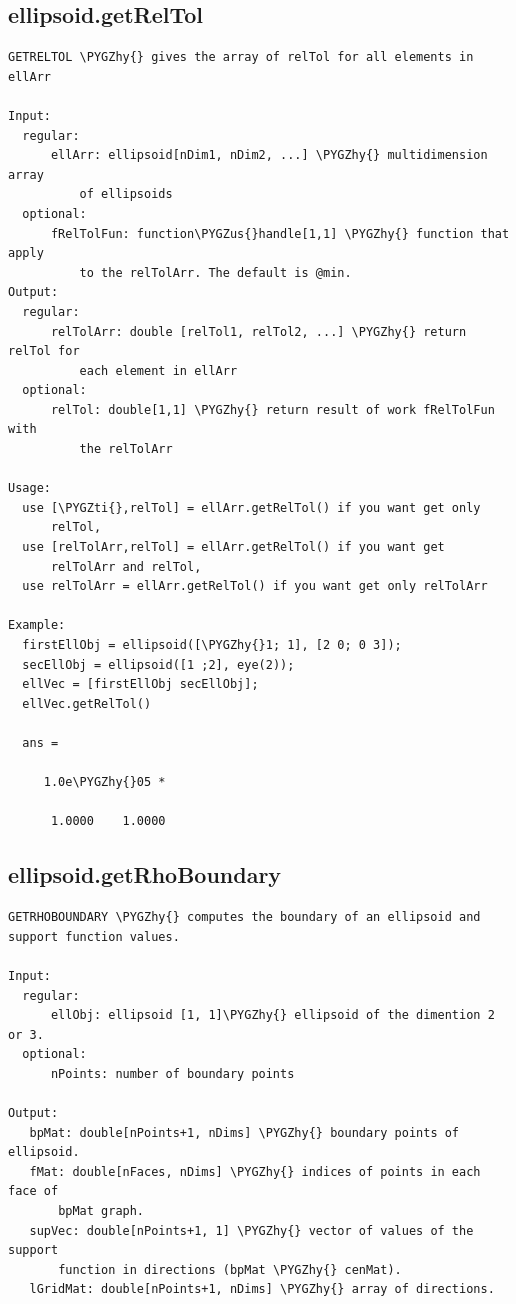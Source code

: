 \documentclass[letterpaper,10pt,english]{sphinxmanual}
\def\PYGZus{\char`\_}
\def\PYGZhy{\char`\-}
\def\PYGZti{\char`\~}
\begin{document}
\subsection{ellipsoid.getRelTol}
\label{chap_functions:ellipsoid-getreltol}
\begin{Verbatim}[commandchars=\\\{\}]
GETRELTOL \PYGZhy{} gives the array of relTol for all elements in ellArr

Input:
  regular:
      ellArr: ellipsoid[nDim1, nDim2, ...] \PYGZhy{} multidimension array
          of ellipsoids
  optional:
      fRelTolFun: function\PYGZus{}handle[1,1] \PYGZhy{} function that apply
          to the relTolArr. The default is @min.
Output:
  regular:
      relTolArr: double [relTol1, relTol2, ...] \PYGZhy{} return relTol for
          each element in ellArr
  optional:
      relTol: double[1,1] \PYGZhy{} return result of work fRelTolFun with
          the relTolArr

Usage:
  use [\PYGZti{},relTol] = ellArr.getRelTol() if you want get only
      relTol,
  use [relTolArr,relTol] = ellArr.getRelTol() if you want get
      relTolArr and relTol,
  use relTolArr = ellArr.getRelTol() if you want get only relTolArr

Example:
  firstEllObj = ellipsoid([\PYGZhy{}1; 1], [2 0; 0 3]);
  secEllObj = ellipsoid([1 ;2], eye(2));
  ellVec = [firstEllObj secEllObj];
  ellVec.getRelTol()

  ans =

     1.0e\PYGZhy{}05 *

      1.0000    1.0000
\end{Verbatim}


\subsection{ellipsoid.getRhoBoundary}
\label{chap_functions:ellipsoid-getrhoboundary}
\begin{Verbatim}[commandchars=\\\{\}]
GETRHOBOUNDARY \PYGZhy{} computes the boundary of an ellipsoid and
support function values.

Input:
  regular:
      ellObj: ellipsoid [1, 1]\PYGZhy{} ellipsoid of the dimention 2 or 3.
  optional:
      nPoints: number of boundary points

Output:
   bpMat: double[nPoints+1, nDims] \PYGZhy{} boundary points of ellipsoid.
   fMat: double[nFaces, nDims] \PYGZhy{} indices of points in each face of
       bpMat graph.
   supVec: double[nPoints+1, 1] \PYGZhy{} vector of values of the support
       function in directions (bpMat \PYGZhy{} cenMat).
   lGridMat: double[nPoints+1, nDims] \PYGZhy{} array of directions.
\end{Verbatim}
\end{document}

